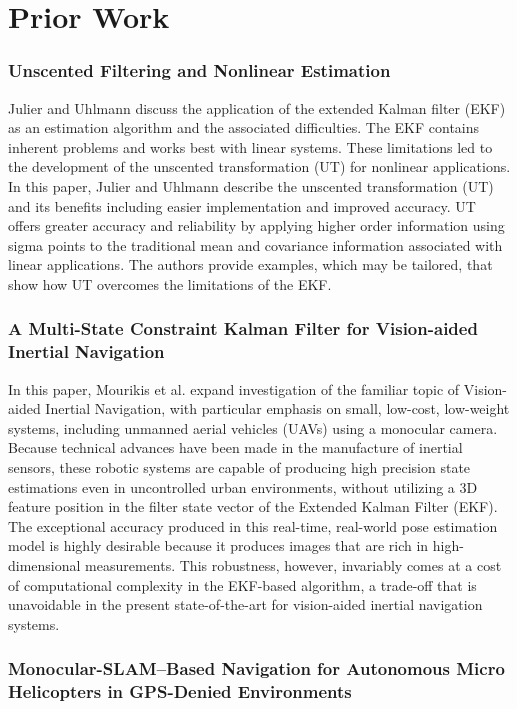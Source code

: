 \chapter{Prior Work}

\subsection{Unscented Filtering and Nonlinear Estimation}

Julier and Uhlmann discuss the application of the extended Kalman filter (EKF) as an estimation algorithm and the associated difficulties. The EKF contains inherent problems and works best with linear systems. These limitations led to the development of the unscented transformation (UT) for nonlinear applications. In this paper, Julier and Uhlmann describe the unscented transformation (UT) and its benefits including easier implementation and improved accuracy. UT offers greater accuracy and reliability by applying higher order information using sigma points to the traditional mean and covariance information associated with linear applications. The authors provide examples, which may be tailored, that show how UT overcomes the limitations of the EKF.

\subsection{A Multi-State Constraint Kalman Filter for Vision-aided Inertial Navigation}

In this paper, Mourikis et al. expand investigation of the familiar topic of Vision-aided Inertial Navigation, with particular emphasis on small, low-cost, low-weight systems, including unmanned aerial vehicles (UAVs) using a monocular camera. Because technical advances have been made in the manufacture of inertial sensors, these robotic systems are capable of producing high precision state estimations even in uncontrolled urban environments, without utilizing a 3D feature position in the filter state vector of the Extended Kalman Filter (EKF). The exceptional accuracy produced in this real-time, real-world pose estimation model is highly desirable because it produces images that are rich in high-dimensional measurements. This robustness, however, invariably comes at a cost of computational complexity in the EKF-based algorithm, a trade-off that is unavoidable in the present state-of-the-art for vision-aided inertial navigation systems.

\subsection{Monocular-SLAM–Based Navigation for Autonomous Micro Helicopters in GPS-Denied Environments}

